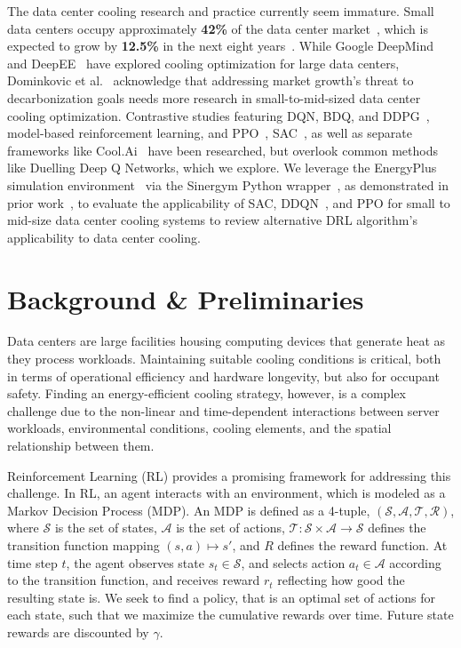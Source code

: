 \documentclass[12pt]{article}
\begin{document}
The data center cooling research and practice currently seem immature. Small data centers occupy approximately \textbf{42\%} of the data center market~\cite{brightlio_data_center_stats}, which is expected to grow by \textbf{12.5\%} in the next eight years~\cite{gminsights_data_center_growth}. While Google DeepMind~\cite{deepmind_cooling} and DeepEE~\cite{deepee} have explored cooling optimization for large data centers, Dominkovic et al.~\cite{cool_data_project} acknowledge that addressing market growth's threat to decarbonization goals needs more research in small-to-mid-sized data center cooling optimization. Contrastive studies featuring DQN, BDQ, and DDPG~\cite{song2021comparison}, model-based reinforcement learning, and PPO~\cite{zhang2019building}, SAC~\cite{sac_comparitive_paper}, as well as separate frameworks like Cool.Ai~\cite{cool_ai_framework} have been researched, but overlook common methods like Duelling Deep Q Networks, which we explore. We leverage the EnergyPlus simulation environment~\cite{energyplus} via the Sinergym Python wrapper~\cite{sinergym_github}, as demonstrated in prior work~\cite{sinergym_paper}, to evaluate the applicability of SAC, DDQN~\cite{wang2016dueling}, and PPO for small to mid-size data center cooling systems to review alternative DRL algorithm's applicability to data center cooling.


\section{Background \& Preliminaries}

Data centers are large facilities housing computing devices that generate heat as they process workloads. Maintaining suitable cooling conditions is critical, both in terms of operational efficiency and hardware longevity, but also for occupant safety. Finding an energy-efficient cooling strategy, however, is a complex challenge due to the non-linear and time-dependent interactions between server workloads, environmental conditions, cooling elements, and the spatial relationship between them.  

Reinforcement Learning (RL) provides a promising framework for addressing this challenge. In RL, an agent interacts with an environment, which is modeled as a Markov Decision Process (MDP). An MDP is defined as a 4-tuple, $(\mathcal S, \mathcal A, \mathcal T, \mathcal R)$, where $\mathcal S$ is the set of states, $\mathcal A$ is the set of actions, $\mathcal T : \mathcal S \times \mathcal A \to \mathcal S$ defines the transition function mapping $(s, a) \mapsto s'$, and $R$ defines the reward function. At time step $t$, the agent observes state $s_t \in \mathcal S$, and selects action $a_t \in \mathcal A$ according to the transition function, and receives reward $r_t$ reflecting how good the resulting state is. We seek to find a policy, that is an optimal set of actions for each state, such that we maximize the cumulative rewards over time. Future state rewards are discounted by $\gamma$. 
\end{document}
